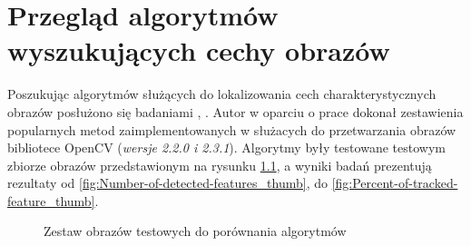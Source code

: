 \chapter{Przegląd algorytmów wyszukujących cechy obrazów}

Poszukując algorytmów służących do lokalizowania cech charakterystycznych obrazów posłużono się badaniami \cite{IK111}, \cite{IK112}. Autor w oparciu o prace \cite{LIFDAS} dokonał zestawienia popularnych metod zaimplementowanych w służacych do przetwarzania obrazów bibliotece OpenCV (\textit{wersje 2.2.0 i 2.3.1}). Algorytmy były testowane testowym zbiorze obrazów przedstawionym na rysunku \ref{fig:zestaw_obrazow_start}, a wyniki badań prezentują rezultaty od \ref{fig:Number-of-detected-features_thumb}, do \ref{fig:Percent-of-tracked-feature_thumb}.

\begin{figure}[!htb]
\begin{center}

\caption{Zestaw obrazów testowych do porównania algorytmów}
\label{fig:zestaw_obrazow_start}
\end{center}
\end{figure}

